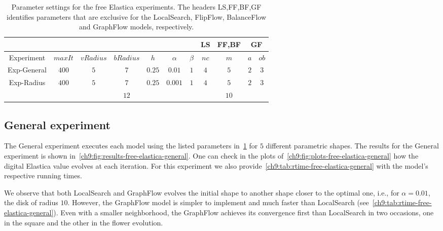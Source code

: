 \begin{table}
\centering
\begin{tabular}{|c|c|c|c|c|c|c|c|c|c|c|}
\cline{8-11}
\multicolumn{7}{c|}{} & LS & FF,BF & \multicolumn{2}{|c|}{GF}\\
\hline
Experiment & $maxIt$ & $vRadius$ & $bRadius$ & $h$ & $\alpha$ & $\beta$  & $nc$ & $m$ & $a$ & $ob$ \\
\hline
Exp-General & $400$ & $5$ & $7$ & $0.25$ & $0.01$ & $1$  & $4$ & $5$ & $2$ & $3$ \\
\hline
\multirow{2}{*}{Exp-Radius} & \multirow{2}{*}{$400$} & \multirow{2}{*}{$5$} & $7$ & \multirow{2}{*}{$0.25$} &  \multirow{2}{*}{$0.001$} & \multirow{2}{*}{$1$}  & \multirow{2}{*}{$4$} & $5$ & \multirow{2}{*}{$2$} & \multirow{2}{*}{$3$} \\
& &  & $12$ & &  & & & $10$ & &  \\
\hline
\end{tabular}
\caption{Parameter settings for the free Elastica experiments. The headers LS,FF,BF,GF identifies parameters that are exclusive for the LocalSearch, FlipFlow, BalanceFlow and GraphFlow models, respectively.}
\label{ch9:tab:free-elastica-parameters-summary}
\end{table}

\subsection{General experiment}

  The General experiment executes each model using the listed parameters in~\cref{ch9:tab:free-elastica-parameters-summary} for $5$ different parametric shapes. The results for the General experiment is shown in~\cref{ch9:fig:results-free-elastica-general}. One can check in the plots of~\cref{ch9:fig:plots-free-elastica-general} how the digital Elastica value evolves at each iteration. For this experiment we also provide~\cref{ch9:tab:rtime-free-elastica-general} with the model's respective running times.
  

We observe that both LocalSearch and GraphFlow evolves the initial shape to another shape closer to the optimal one, i.e., for $\alpha=0.01$, the disk of radius $10$. However, the GraphFlow model is simpler to implement and much faster than LocalSearch (see~\cref{ch9:tab:rtime-free-elastica-general}). Even with a smaller neighborhood, the GraphFlow achieves its convergence first than LocalSearch in two occasions, one in the square and the other in the flower evolution.

